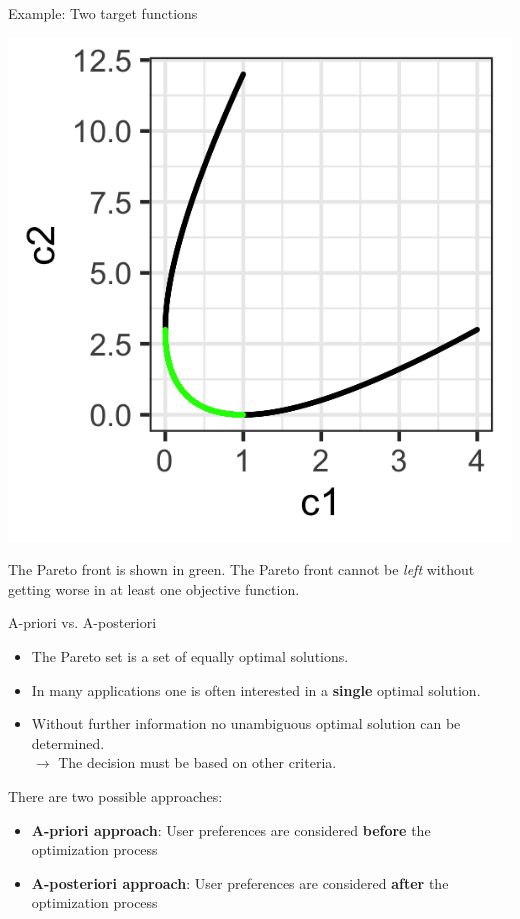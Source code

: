 \begin{frame}[allowframebreaks]{Example: Two target functions}
    \begin{center}
    \includegraphics[scale=0.2]{images/graph3}
    \end{center}
    \vspace*{-0.3cm}

The Pareto front is shown in green.
    The Pareto front cannot be \emph{left} without getting worse in at least one objective function.

\end{frame}


\begin{frame}{A-priori vs. A-posteriori}

\begin{itemize}
\item The Pareto set is a set of equally optimal solutions.
\item In many applications one is often interested in a \textbf{single} optimal solution.
\item Without further information no unambiguous optimal solution can be determined. \\
$\to$ The decision must be based on other criteria.
\end{itemize}

    \vspace{0.5cm}

There are two possible approaches:
\begin{itemize}
\item \textbf{A-priori approach}: User preferences are considered \textbf{before} the optimization process
\item \textbf{A-posteriori approach}: User preferences are considered \textbf{after} the optimization process
\end{itemize}

\end{frame}

